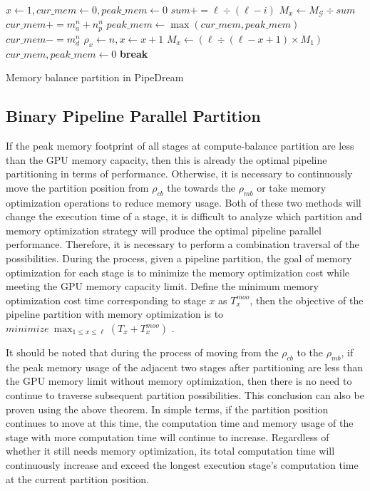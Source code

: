 \begin{algorithm}
  $x \leftarrow 1,cur\_mem \leftarrow 0,peak\_mem \leftarrow 0$\;
  \For{$i$ in $[0,\ell)$}
  {
    $sum += \ell \div (\ell-i)$\;
  }
  $M_x \leftarrow M_\mathcal{G} \div sum$\;
  {
    $cur\_mem += m_a^n + n_p^n$\;
    $peak\_mem \leftarrow \max(cur\_mem,peak\_mem)$\;
    $cur\_mem -= m_d^n$\;
    {
      $\rho_x \leftarrow n,x \leftarrow x + 1$\;
      $M_x \leftarrow (\ell \div (\ell -x + 1) \times M_1)$\;
      $cur\_mem, peak\_mem \leftarrow 0$\;
      {
        \textbf{break}\;
      }
    }
  }
\caption{Memory balance partition in PipeDream}
\label{alg:mem-ba}
\end{algorithm}

\subsection{Binary Pipeline Parallel Partition}
If the peak memory footprint of all stages at compute-balance partition
are less than the GPU memory capacity,
then this is already the optimal pipeline partitioning
in terms of performance.
Otherwise, it is necessary to continuously move the partition position from
$\rho_{cb}$ the towards the $\rho_{mb}$ or take memory optimization
operations to reduce memory usage.
Both of these two methods will change the execution time of a stage,
it is difficult to analyze which partition and memory optimization strategy
will produce the optimal pipeline parallel performance.
Therefore, it is necessary to perform a combination traversal of the possibilities.
During the process, given a pipeline partition, the goal of memory optimization for each stage
is to minimize the memory optimization cost while meeting the GPU memory capacity limit.
Define the minimum memory optimization cost time corresponding to stage $x$ as $T_x^{moo}$,
then the objective of the pipeline partition with memory optimization
is to $minimize\ \max_{1 \leq x \leq \ell} (T_x + T_x^{moo})$ .

It should be noted that during the process of moving from the $\rho_{cb}$
to the $\rho_{mb}$, if the peak memory usage of the adjacent two stages after partitioning
are less than the GPU memory limit without memory optimization,
then there is no need to continue to traverse subsequent partition possibilities.
This conclusion can also be proven using the above theorem.
In simple terms, if the partition position continues to move at this time,
the computation time and memory usage of the stage
with more computation time will continue to increase.
Regardless of whether it still needs memory optimization,
its total computation time will continuously increase
and exceed the longest execution stage's computation time at the current partition position.

